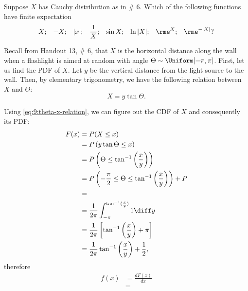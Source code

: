 \begin{problem}[Handout 13, \# 10]
  Suppose \(X\) has Cauchy distribution as in \# 6. Which of the following
  functions have finite expectation
  \[
    \begin{aligned}
      X;&&-X;&&|x|;&&\frac{1}{X};&&\sin X;&&\ln|X|;&&\rme^X;&&\rme^{-|X|}?
    \end{aligned}
  \]
\end{problem}
\begin{solution}
  Recall from Handout 13, \# 6, that \(X\) is the horizontal distance along
  the wall when a flashlight is aimed at random with angle
  \(\Theta\sim\Uniform[-\pi,\pi]\). First, let us find the PDF of
  \(X\). Let \(y\) be the vertical distance from the light source to the
  wall. Then, by elementary trigonometry, we have the following relation
  between \(X\) and \(\Theta\):
  \begin{equation}
    \label{eq:9:theta-x-relation}
    X=y\tan\Theta.
  \end{equation}

  Using \eqref{eq:9:theta-x-relation}, we can figure out the CDF of \(X\)
  and consequently its PDF:
  \begin{align*}
    F(x)
    &=P(X\leq x)\\
    &=P\left(y\tan\Theta\leq x\right)\\
    &=P\left(\Theta\leq \tan^{-1}\left(\frac{x}{y}\right)\right)\\
    &=P\left(-\frac{\pi}{2}\leq%
      \Theta\leq%
      \tan^{-1}\left(\frac{x}{y}\right)\right)
      +P
    \\
    &=\\
    &=\frac{1}{2\pi}\int_{-\pi}^{\tan^{-1}(\frac{x}{y})} 1\diff y\\
    &=\frac{1}{2\pi}\left[\tan^{-1}\left(\frac{x}{y}\right)+\pi\right]\\
    &=\frac{1}{2\pi}\tan^{-1}\left(\frac{x}{y}\right)+\frac{1}{2},
  \end{align*}
  therefore
  \begin{align*}
    f(x)
    &=\frac{dF(x)}{dx}\\
    &=
  \end{align*}
\end{solution}
\newpage

